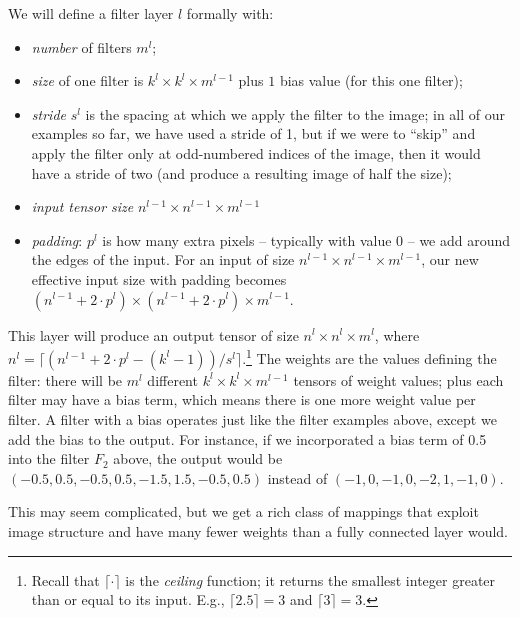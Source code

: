 We will define a filter layer $l$ formally with:
\begin{itemize}
  \item {\em number} of filters $m^l$;
  \item {\em size} of one filter is $k^l \times k^l \times m^{l-1}$ plus $1$ bias
        value (for this one filter);
  \item {\em stride} $s^l$ is the spacing at which we apply the filter
        to the image;  in all of our examples so far, we have used a stride
        of 1, but if we were to ``skip'' and apply the filter only at
        odd-numbered indices of the image, then it would have a stride of
        two (and produce a resulting image of half the size);
  \item {\em input tensor size} $n^{l-1} \times n^{l-1} \times m^{l-1}$
  \item {\em padding}: $p^l$ is how many extra pixels -- typically with value 0 --
        we add around the edges of the input. For an input of size  $n^{l-1} \times n^{l-1} \times m^{l-1}$,
        our new effective input size with padding becomes $(n^{l-1} + 2 \cdot p^l) \times (n^{l-1} + 2 \cdot p^l) \times m^{l-1}$.
\end{itemize}
This layer will produce an output tensor of size $n^l \times n^l \times
  m^l$, where $n^l = \lceil (n^{l-1} + 2 \cdot p^l - (k^l - 1)) / s^l \rceil$.\footnote{
  Recall that $\lceil \cdot \rceil$ is the \emph{ceiling} function; it returns the smallest
  integer greater than or equal to its input. E.g., $\lceil 2.5 \rceil = 3$ and $\lceil 3 \rceil = 3$.}
The weights are the values defining the filter: there will be $m^l$
different $k^l \times k^l \times m^{l-1}$ tensors of weight values; plus
each filter may have a bias term, which means there is one more weight value per
filter.
A filter with a bias operates just like the filter examples above, except we
add the bias to the output. For instance, if we incorporated a bias term of 0.5 into
the filter $F_2$ above, the output would be $(-0.5,0.5,-0.5,0.5, -1.5, 1.5,-0.5,0.5)$
instead of $(-1,0,-1,0,-2,1,-1,0)$.

This may seem complicated, but we get a rich class of mappings that
exploit image structure and have many fewer weights than a fully
connected layer would.

